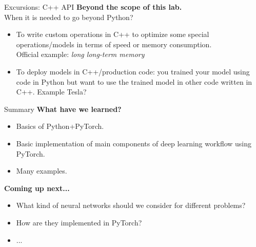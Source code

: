 

\begin{frame}{Excursions: C++ API}
\textbf{Beyond the scope of this lab.} \\
\vsp
When it is needed to go beyond Python?
\vsp
\begin{itemize}
\item To write custom operations in C++ to optimize some
special operations/models in terms of speed or memory consumption.\\
Official example: \textit{long long-term memory}
\item To deploy models in C++/production code: you trained your model using code in Python but want to use the trained model in other code written in C++. Example Tesla?
\end{itemize}
\end{frame}

\begin{frame}{Summary}
\textbf{What have we learned?}
\begin{itemize}
\item Basics of Python+PyTorch.
\item Basic implementation of main components of deep learning workflow using PyTorch.
\item Many examples.
\end{itemize}
\vsp
\textbf{Coming up next...}
\begin{itemize}
\item What kind of neural networks should we consider for different problems?
\item How are they implemented in PyTorch?
\item ...
\end{itemize}
\end{frame}

